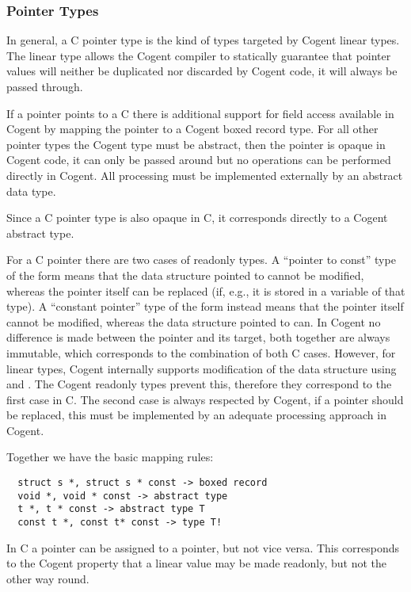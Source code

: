 \subsubsection{Pointer Types}

In general, a C pointer type  is the kind of types targeted by Cogent linear types. The linear type 
allows the Cogent compiler to statically guarantee that pointer values will neither be duplicated nor 
discarded by Cogent code, it will always be passed through. 

If a pointer points to a C  there is additional support for field access available in Cogent by 
mapping the pointer to a Cogent boxed record type. For all other pointer types the Cogent type must be abstract, 
then the pointer is opaque in Cogent code, it can only be passed around but no operations can be performed 
directly in Cogent. All processing must be implemented externally by an abstract data type.

Since a C  pointer type is also opaque in C, it corresponds directly to a Cogent abstract type.

For a C pointer there are two cases of readonly types. A ``pointer to const'' type of the form 
means that the data structure pointed to cannot be modified, whereas the pointer itself can be replaced 
(if, e.g., it is stored in a variable of that type). A ``constant pointer'' type of the form 
instead means that the pointer itself cannot be modified, whereas the data structure pointed to can. In Cogent 
no difference is made between the pointer and its target, both together are always immutable, which corresponds 
to the combination of both C cases. However, for linear types, Cogent internally supports modification of the
data structure using  and . The Cogent readonly types prevent this, therefore they correspond
to the first case in C. The second case is always respected by Cogent, if a pointer should be replaced, this 
must be implemented by an adequate processing approach in Cogent. 

Together we have the basic mapping rules:
\begin{verbatim}
  struct s *, struct s * const -> boxed record
  void *, void * const -> abstract type
  t *, t * const -> abstract type T
  const t *, const t* const -> type T!
\end{verbatim}

In C a  pointer can be assigned to a  pointer, but not vice versa. This corresponds to
the Cogent property that a linear value may be made readonly, but not the other way round.

